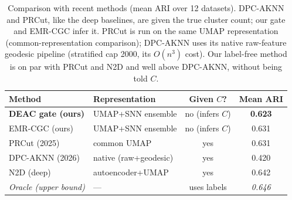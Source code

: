 \begin{table}[htbp]
\centering
\caption{Comparison with recent methods (mean ARI over 12 datasets). DPC-AKNN and PRCut, like the deep baselines, are given the true cluster count; our gate and EMR-CGC infer it. PRCut is run on the same UMAP representation (common-representation comparison); DPC-AKNN uses its native raw-feature geodesic pipeline (stratified cap 2000, its $O(n^3)$ cost). Our label-free method is on par with PRCut and N2D and well above DPC-AKNN, without being told $C$.}
\label{tab:recent}
\footnotesize
\setlength{\tabcolsep}{5pt}
\begin{tabular}{llcc}
\toprule
Method & Representation & Given $C$? & Mean ARI \\
\midrule
\textbf{DEAC gate (ours)} & UMAP+SNN ensemble & no (infers $C$) & \textbf{0.623} \\
EMR-CGC (ours) & UMAP+SNN ensemble & no (infers $C$) & 0.631 \\
PRCut (2025)~\cite{ghriss2025prcut} & common UMAP & yes & 0.631 \\
DPC-AKNN (2026)~\cite{wang2026density} & native (raw+geodesic) & yes & 0.420 \\
\midrule
N2D (deep)~\cite{mcconville2021n2d} & autoencoder+UMAP & yes & 0.642 \\
\textit{Oracle (upper bound)} & --- & uses labels & \textit{0.646} \\
\bottomrule
\end{tabular}
\end{table}
